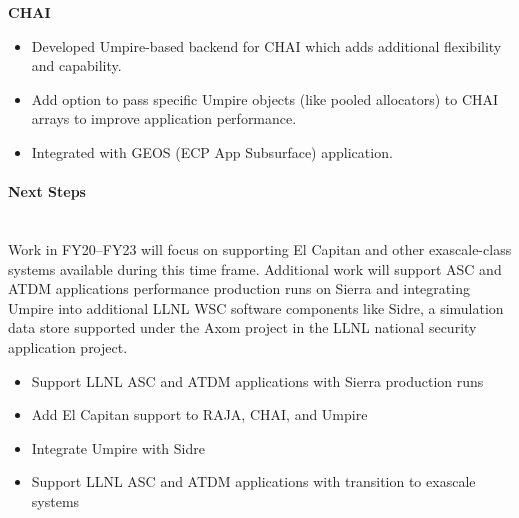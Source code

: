 {\bf CHAI}
\begin{itemize}
\item Developed Umpire-based backend for CHAI which adds additional flexibility
      and capability.
\item Add option to pass specific Umpire objects (like pooled allocators) to
      CHAI arrays to improve application performance.
\item Integrated with GEOS (ECP App Subsurface) application.
\end{itemize}

\paragraph{Next Steps}  \leavevmode \\

Work in FY20–FY23 will focus on supporting El Capitan and other
exascale-class systems available during this time frame. Additional work
will support ASC and ATDM applications performance production runs on
Sierra and integrating Umpire into additional LLNL WSC software
components like Sidre, a simulation data store supported under the Axom
project in the LLNL national security application project.

\begin{itemize}
\item Support LLNL ASC and ATDM applications with Sierra production runs
\item Add El Capitan support to RAJA, CHAI, and Umpire
\item Integrate Umpire with Sidre
\item Support LLNL ASC and ATDM applications with transition to exascale
      systems
\end{itemize}
